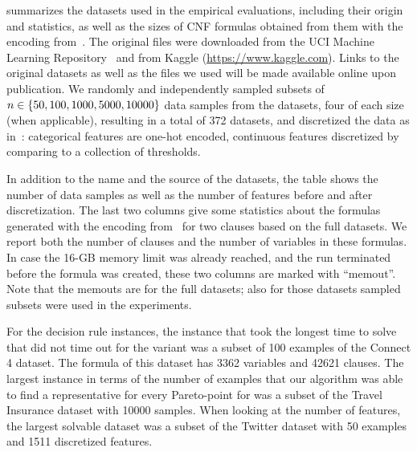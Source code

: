 
 summarizes the datasets used in the empirical evaluations, including their origin and statistics, as well as the sizes of CNF formulas obtained from them with the encoding from~\textcite{DBLP:conf/cp/MaliotovM18}.
The original files were downloaded from the UCI Machine Learning Repository~\autocite{UciMlr} and from Kaggle ({\small\url{https://www.kaggle.com}}).
Links to the original datasets as well as the files we used will be made available online upon publication.
We randomly and independently sampled subsets of $n\in\{50,100,1000,5000,10000\}$ data samples from the datasets, four of each size (when applicable), resulting in a         
total of 372 datasets, and discretized the data as in~\autocite{DBLP:conf/cp/MaliotovM18}:
categorical features are one-hot encoded, continuous features discretized by comparing to a collection of thresholds. 

In addition to the name and the source of the datasets, the table shows the number of data samples as well as the number of features before and after discretization.
The last two columns give some statistics about the formulas generated with the encoding from~\textcite{DBLP:conf/cp/MaliotovM18} for two clauses based on the full datasets.
We report both the number of clauses and the number of variables in these formulas.
In case the 16-GB memory limit was already reached, and the run terminated before the formula was created, these two columns are marked with ``memout''.
Note that the memouts are for the full datasets; also for those datasets sampled subsets were used in the experiments.

For the decision rule instances, the instance that took the longest time to solve that did not time out for the \msh{} variant was a subset of 100 examples of the Connect 4 dataset.
The formula of this dataset has 3362 variables and 42621 clauses.
The largest instance in terms of the number of examples that our algorithm was able to find a representative for every Pareto-point for was a subset of the Travel Insurance dataset with 10000 samples.
When looking at the number of features, the largest solvable dataset was a subset of the Twitter dataset with 50 examples and 1511 discretized features.

